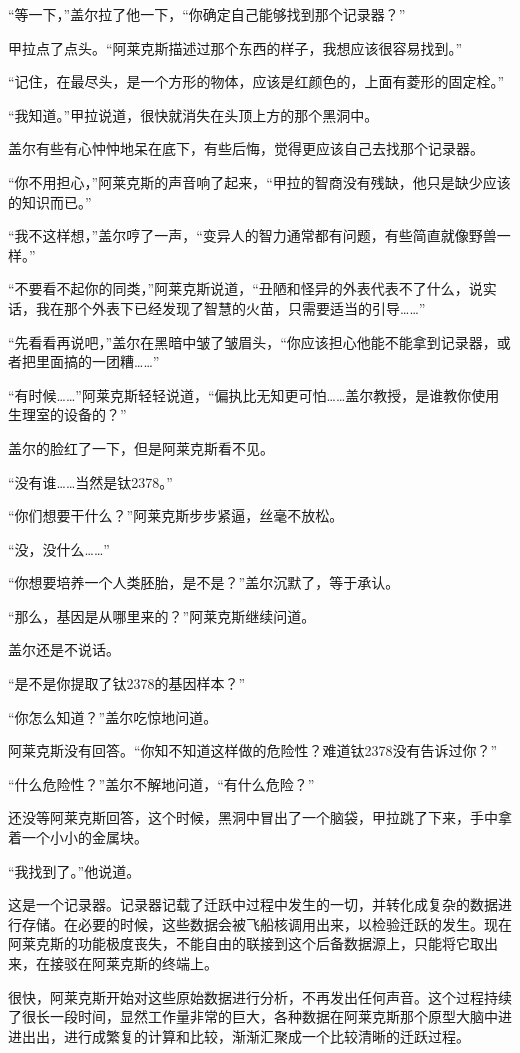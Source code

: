 “等一下，”盖尔拉了他一下，“你确定自己能够找到那个记录器？” 

甲拉点了点头。“阿莱克斯描述过那个东西的样子，我想应该很容易找到。” 

“记住，在最尽头，是一个方形的物体，应该是红颜色的，上面有菱形的固定栓。” 

“我知道。”甲拉说道，很快就消失在头顶上方的那个黑洞中。 

盖尔有些有心忡忡地呆在底下，有些后悔，觉得更应该自己去找那个记录器。 

“你不用担心，”阿莱克斯的声音响了起来，“甲拉的智商没有残缺，他只是缺少应该的知识而已。” 

“我不这样想，”盖尔哼了一声，“变异人的智力通常都有问题，有些简直就像野兽一样。” 

“不要看不起你的同类，”阿莱克斯说道，“丑陋和怪异的外表代表不了什么，说实话，我在那个外表下已经发现了智慧的火苗，只需要适当的引导……” 

“先看看再说吧，”盖尔在黑暗中皱了皱眉头，“你应该担心他能不能拿到记录器，或者把里面搞的一团糟……” 

“有时候……”阿莱克斯轻轻说道，“偏执比无知更可怕……盖尔教授，是谁教你使用生理室的设备的？” 

盖尔的脸红了一下，但是阿莱克斯看不见。 

“没有谁……当然是钛2378。” 

“你们想要干什么？”阿莱克斯步步紧逼，丝毫不放松。 

“没，没什么……” 

“你想要培养一个人类胚胎，是不是？”盖尔沉默了，等于承认。 

“那么，基因是从哪里来的？”阿莱克斯继续问道。 

盖尔还是不说话。 

“是不是你提取了钛2378的基因样本？” 

“你怎么知道？”盖尔吃惊地问道。 

阿莱克斯没有回答。“你知不知道这样做的危险性？难道钛2378没有告诉过你？” 

“什么危险性？”盖尔不解地问道，“有什么危险？” 

还没等阿莱克斯回答，这个时候，黑洞中冒出了一个脑袋，甲拉跳了下来，手中拿着一个小小的金属块。 

“我找到了。”他说道。 

这是一个记录器。记录器记载了迁跃中过程中发生的一切，并转化成复杂的数据进行存储。在必要的时候，这些数据会被飞船核调用出来，以检验迁跃的发生。现在阿莱克斯的功能极度丧失，不能自由的联接到这个后备数据源上，只能将它取出来，在接驳在阿莱克斯的终端上。 

很快，阿莱克斯开始对这些原始数据进行分析，不再发出任何声音。这个过程持续了很长一段时间，显然工作量非常的巨大，各种数据在阿莱克斯那个原型大脑中进进出出，进行成繁复的计算和比较，渐渐汇聚成一个比较清晰的迁跃过程。 

